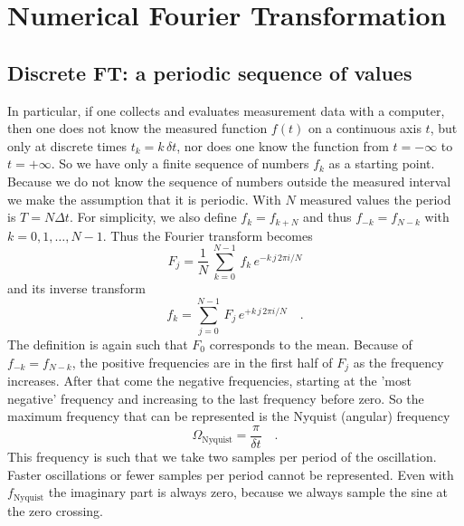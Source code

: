 \renewcommand{\lastmod}{September 18, 2023}
\renewcommand{\chapterauthors}{Markus Lippitz}

\chapter{Numerical Fourier Transformation}



\section{Discrete FT: a periodic sequence of values}


In particular, if one collects and evaluates measurement data with a computer, then one does not know the measured function $f(t)$ on a continuous axis $t$, but only at discrete times $t_k = k \, \delta t$, nor does one know the function from $t = - \infty$ to $t = + \infty$. So we have only a finite sequence of numbers $f_k$ as a starting point.
Because we do not know the sequence of numbers outside the measured interval we make the assumption that it is periodic. With $N$ measured values the period is $T = N \Delta t$. For simplicity, we also define $f_k = f_{k + N}$ and thus $f_{-k} = f_{N - k}$ with $k= 0, 1, \dots, N-1$. Thus the Fourier transform becomes
\begin{equation}
  F_j =  \frac{1}{N} \, \sum_{k=0}^{N-1} \, f_k \, e^{- k \, j \, 2 \pi i / N } 
 \end{equation}
and its inverse transform
 \begin{equation}
 f_k =   \sum_{j=0}^{N-1} \, F_j \, e^{+ k \,  j \, 2 \pi i / N } \quad .
 \end{equation}
The definition is again such that $F_0$ corresponds to the mean. Because of $f_{-k} = f_{N - k}$, the positive frequencies are in the first half of $F_j$ as the frequency increases. After that come the negative frequencies, starting at the 'most negative' frequency and increasing to the last frequency before zero. So the maximum frequency that can be represented is the Nyquist (angular) frequency
\begin{equation}
\Omega_\text{Nyquist} = \frac{\pi}{\delta t} \quad .
\end{equation}
%
This frequency is such that we take two samples per period of the
oscillation. Faster oscillations or fewer samples per period cannot be
represented. Even with $f_\text{Nyquist}$ the imaginary part is always zero, because we always sample the sine at the 
zero crossing.


